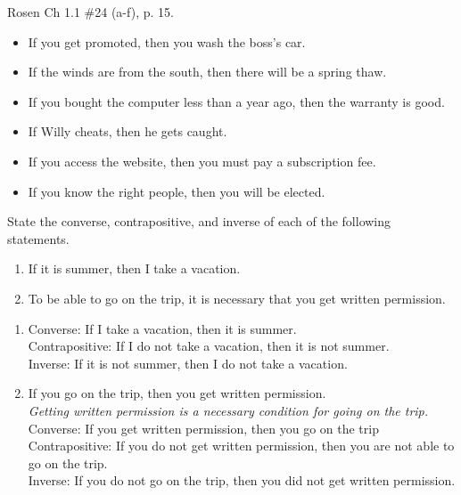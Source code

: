 \begin{questions}
 Rosen Ch 1.1 \#24 (a-f), p. 15.
    \ifprintanswers
        \vspace{-10pt}
    \fi
    \begin{solution}
    \begin{itemize}[itemsep=0pt,parsep=0pt,
    topsep=0pt,partopsep=0pt]
    	\item If you get promoted, then you wash the boss’s car.
        \item If the winds are from the south, then there will be a spring thaw.
    	\item If you bought the computer less than a year ago, then the warranty is good.
    	\item If Willy cheats, then he gets caught.
        \item If you access the website, then you must pay a subscription fee.
        \item If you know the right people, then you will be elected.
    \end{itemize}
    \end{solution}



 State the converse, contrapositive, and inverse of each of the following statements.
    \begin{enumerate}[label=(\alph*),itemsep=0pt,parsep=0pt,topsep=0pt,partopsep=0pt]
        \item If it is summer, then I take a vacation.
        \item To be able to go on the trip, it is necessary that you get written permission.
    \end{enumerate}
    \ifprintanswers
        \vspace{-10pt}
    \fi
    \begin{solution}
    \begin{enumerate}[label=(\alph*),itemsep=0pt,parsep=0pt,topsep=0pt,partopsep=0pt]
        \item Converse: If I take a vacation, then it is summer. \\
            Contrapositive: If I do not take a vacation, then it is not summer. \\
            Inverse: If it is not summer, then I do not take a vacation. 
        \medskip
        \item If you go on the trip, then you get written permission. \\
            \textit{Getting written permission is a necessary condition for going on the trip.} \\
            Converse: If you get written permission, then you go on the trip \\
            Contrapositive: If you do not get written permission, then you are not able to go on the trip. \\
            Inverse: If you do not go on the trip, then you did not get written permission.
    \end{enumerate}
    \end{solution}




\end{questions}
